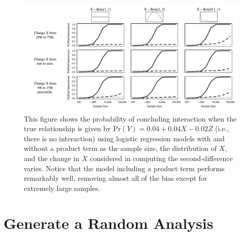\documentclass[12pt]{article}
\begin{document}
\begin{appendix}
\begin{figure}[H]
\begin{center}
\includegraphics[scale = .8]{fig/fig-fixed-few1s.pdf}
\end{center}\caption{This figure shows the probability of concluding interaction when the true relationship is given by $\text{Pr}(Y) = 0.04 + 0.04X - 0.02Z$ (i.e., there is no interaction) using logistic regression models with and without a product term as the sample size, the distribution of $X$, and the change in $X$ considered in computing the second-difference varies. Notice that the model including a product term performs remarkably well, removing almost all of the bias except for extremely large samples. }\label{fig:fixed-few1s}
\end{figure}

\section{Generate a Random Analysis}


\end{appendix}
\end{document}
